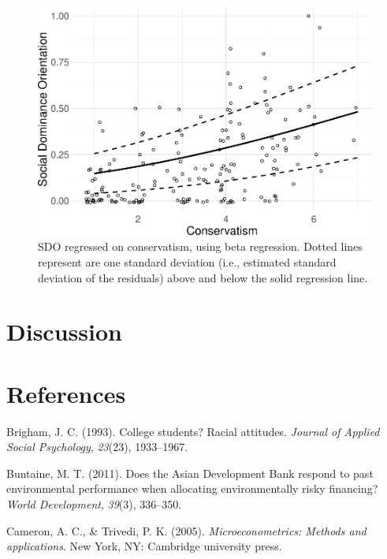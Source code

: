 \documentclass[english,man]{apa6}
\theoremstyle{definition}
\theoremstyle{definition}
\theoremstyle{remark}
\begin{document}
\begin{figure}
\centering
\includegraphics{beta_hurdle_files/figure-latex/unnamed-chunk-19-1.pdf}
\caption{\label{fig:unnamed-chunk-19}SDO regressed on conservatism, using
beta regression. Dotted lines represent are one standard deviation
(i.e., estimated standard deviation of the residuals) above and below
the solid regression line.}
\end{figure}

\section{Discussion}\label{discussion}

\newpage

\section{References}\label{references}

\setlength{\parindent}{-0.5in} \setlength{\leftskip}{0.5in}

\hypertarget{refs}{}
\hypertarget{ref-brigham1993college}{}
Brigham, J. C. (1993). College students? Racial attitudes. \emph{Journal
of Applied Social Psychology}, \emph{23}(23), 1933--1967.

\hypertarget{ref-buntaine2011does}{}
Buntaine, M. T. (2011). Does the Asian Development Bank respond to past
environmental performance when allocating environmentally risky
financing? \emph{World Development}, \emph{39}(3), 336--350.

\hypertarget{ref-cameron2005microeconometrics}{}
Cameron, A. C., \& Trivedi, P. K. (2005). \emph{Microeconometrics:
Methods and applications}. New York, NY: Cambridge university press.
\end{document}
